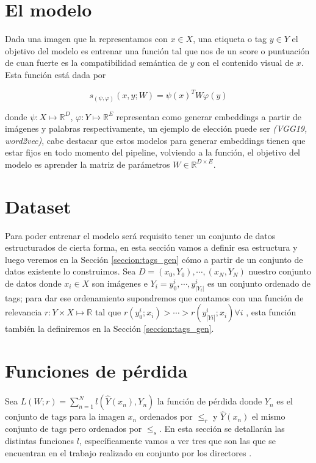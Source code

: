 \section{El modelo} \label{sec:model}

Dada una imagen que la representamos con $x \in X$, una etiqueta o tag $y \in Y$ el objetivo del modelo es entrenar una función tal que nos de un score o puntuación de cuan fuerte es la compatibilidad semántica de $y$ con el contenido visual de $x$. Esta función está dada por 

\begin{equation} \label{eq:the_model}
s_{( \psi, \varphi)}(x, y ;W) = \psi(x)^{T} W \varphi(y)
\end{equation}

donde $\psi: X \mapsto \mathbb{R}^{D}$, $\varphi: Y \mapsto \mathbb{R}^{E}$ representan como generar embeddings a partir de imágenes y palabras respectivamente, un ejemplo de elección puede ser \textit{(VGG19, word2vec)}, cabe destacar que estos modelos para generar embeddings tienen que estar fijos en todo momento del pipeline, volviendo a la función, el objetivo del modelo es aprender la matriz de parámetros $W \in \mathbb{R}^{D \times E}$.


\section{Dataset} \label{sec:dataset}

Para poder entrenar el modelo será requisito tener un conjunto de datos estructurados de cierta forma, en esta sección vamos a definir esa estructura y luego veremos en la Sección \ref{seccion:tags_gen} cómo a partir de un conjunto de datos existente lo construimos. Sea $D  = {(x_{0}, Y_{0}), \cdots , (x_{N}, Y_{N})}$ nuestro conjunto de datos donde $x_{i} \in X$ son imágenes e $Y_{i} = {y_{0}^{i}, \cdots , y_{|Y_{i}|}^{i}}$ es un conjunto ordenado de tags; para dar ese ordenamiento supondremos que contamos con una función de relevancia $r: Y \times X \mapsto \mathbb{R}$  tal que $r(y_{0}^{i}; x_{i}) > \cdots > r(y_{|Yi|}^{i};x_{i}) \forall i$ , esta función también la definiremos en la Sección \ref{seccion:tags_gen}.

\section{Funciones de pérdida}

Sea $L(W;r) = \sum_{n=1}^{N} l(\hat{Y}(x_{n}), Y_{n})$ la función de pérdida donde $Y_{n}$ es el conjunto de tags para la imagen $x_{n}$ ordenados por $\leqslant_{r}$ y $\hat{Y}(x_{n})$ el mismo conjunto de tags pero ordenados por $\leqslant_{s}$.
En esta sección se detallarán las distintas funciones $l$, específicamente vamos a ver tres que son las que se encuentran en el trabajo realizado en conjunto por los directores \cite{PaperDirectors}.

